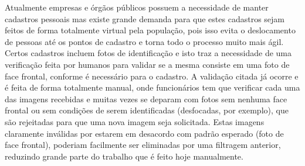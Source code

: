 Atualmente empresas e órgãos públicos possuem a necessidade de manter cadastros pessoais mas existe grande demanda para que estes cadastros sejam feitos de forma totalmente virtual pela população, pois isso evita o deslocamento de pessoas até os pontos de cadastro e torna todo o processo muito mais ágil. 
Certos cadastros incluem fotos de identificação e isto traz a necessidade de uma verificação feita por humanos para validar se a mesma consiste em uma foto de face frontal, conforme é necessário para o cadastro.
A validação citada já ocorre e é feita de forma totalmente manual, onde funcionários tem que verificar cada uma das imagens recebidas e muitas vezes se deparam com fotos sem nenhuma face frontal ou sem condições de serem identificadas (desfocadas, por exemplo), que são rejeitadas para que uma nova imagem seja solicitada.
Estas imagens claramente inválidas por estarem em desacordo com padrão esperado (foto de face frontal), poderiam facilmente ser eliminadas por uma filtragem anterior, reduzindo grande parte do trabalho que é feito hoje manualmente.